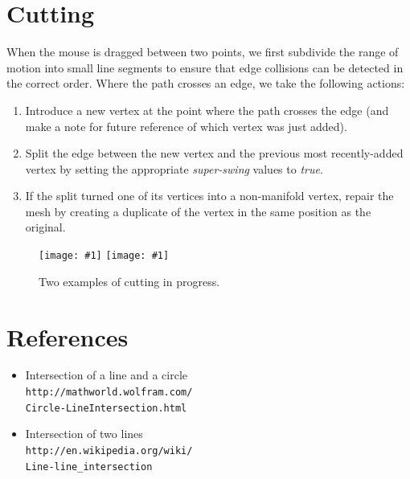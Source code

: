 \documentclass{article}
\newcommand\screenshot[1]{\texttt{[image: \#1]}}
\begin{document}
\section{Cutting}

When the mouse is dragged between two points,
we first subdivide the range of motion into small
line segments to ensure that edge collisions can be
detected in the correct order.
Where the path crosses an edge,
we take the following actions:
\begin{enumerate}
\item Introduce a new vertex at the point where the
path crosses the edge (and make a note for future
reference of which vertex was just added).
\item Split the edge between the new vertex and the
previous most recently-added vertex by setting the
appropriate \textit{super-swing} values to \textit{true}.
\item If the split turned one of its vertices into a
non-manifold vertex, repair the mesh by creating a
duplicate of the vertex in the same position as the
original.
\end{enumerate}

\begin{figure}[h!]
\centering
\screenshot{cut}
\screenshot{cut-debug}
\caption{Two examples of cutting in progress.}
\end{figure}

\section{References}

\begin{itemize}
\item Intersection of a line and a circle\\
\texttt{http://mathworld.wolfram.com/\\Circle-LineIntersection.html}
\item Intersection of two lines\\
\texttt{http://en.wikipedia.org/wiki/\\Line-line\_intersection}
\end{itemize}
\end{document}
